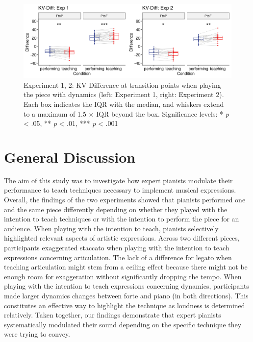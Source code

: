 \documentclass[
  man,floatsintext]{apa6}
\begin{document}
\begin{figure}
\includegraphics[width=1\linewidth]{manuscript_files/figure-latex/plot-vel-diff-1} \caption{\label{fig:vel-diff}Experiment 1, 2: KV Difference at transition points when playing the piece with dynamics (left: Experiment 1, right: Experiment 2). Each box indicates the IQR with the median, and whiskers extend to a maximum of 1.5 × IQR beyond the box. Significance levels: * \textit{p} < .05, ** \textit{p} < .01, *** \textit{p} < .001}\label{fig:plot-vel-diff}
\end{figure}

\newpage

\hypertarget{general-discussion}{%
\section{General Discussion}\label{general-discussion}}

The aim of this study was to investigate how expert pianists modulate their performance to teach techniques necessary to implement musical expressions. Overall, the findings of the two experiments showed that pianists performed one and the same piece differently depending on whether they played with the intention to teach techniques or with the intention to perform the piece for an audience. When playing with the intention to teach, pianists selectively highlighted relevant aspects of artistic expressions. Across two different pieces, participants exaggerated staccato when playing with the intention to teach expressions concerning articulation. The lack of a difference for legato when teaching articulation might stem from a ceiling effect because there might not be enough room for exaggeration without significantly dropping the tempo. When playing with the intention to teach expressions concerning dynamics, participants made larger dynamics changes between forte and piano (in both directions). This constitutes an effective way to highlight the technique as loudness is determined relatively. Taken together, our findings demonstrate that expert pianists systematically modulated their sound depending on the specific technique they were trying to convey.
\end{document}
